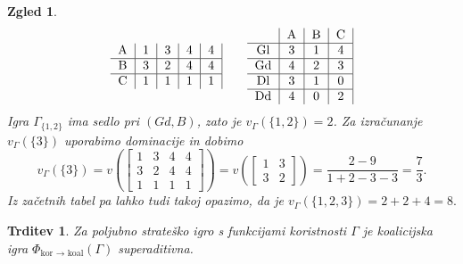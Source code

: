 \documentclass[10pt, a4paper]{article}
\newtheorem{trditev}[izr]{Trditev}
\newtheorem{zgled}[izr]{Zgled}
\begin{document}
\begin{zgled}
$${\begin{tabular}{c|c|c|c|c|}
  \textrm{A} & 1 & 3 & 4 & 4\\
  \hline
  \textrm{B} & 3 & 2 & 4 & 4\\
  \hline
  \textrm{C} & 1 & 1 & 1 & 1
\end{tabular}}\qquad 
{\begin{tabular}{c|c|c|c|}
  & \textrm{A} & \textrm{B} & \textrm{C}\\
  \hline
  \textrm{Gl} & 3 & 1 & 4\\
  \hline
  \textrm{Gd} & 4 & 2 & 3\\
  \hline
  \textrm{Dl} & 3 & 1 & 0\\
  \hline 
  \textrm{Dd} & 4 & 0 & 2\\
\end{tabular}}
$$
Igra $\Gamma_{\{1, 2\}}$ ima sedlo pri $(Gd, B)$, zato je $v_{\Gamma} (\{1, 2\}) = 2$.
Za izračunanje $v_\Gamma (\{3\})$ uporabimo dominacije in dobimo 
$$v_\Gamma (\{3\}) = v\left(\begin{bmatrix}
  1 & 3 & 4 & 4\\
  3 & 2 & 4 & 4\\
  1 & 1 & 1 & 1
\end{bmatrix}\right) = v\left(\begin{bmatrix}
  1 & 3\\
  3 & 2
\end{bmatrix}\right) = \frac{2 - 9}{1 + 2 - 3 - 3} = \frac{7}{3}.$$
Iz začetnih tabel pa lahko tudi takoj opazimo, da je $v_\Gamma (\{1, 2, 3\}) = 2 + 2 + 4 = 8.$
\end{zgled}

\begin{trditev}
  Za poljubno strateško igro s funkcijami koristnosti $\Gamma$
  je koalicijska igra $\Phi_{\text{kor $\to$ koal}} (\Gamma)$ superaditivna.
\end{trditev}
\end{document}
